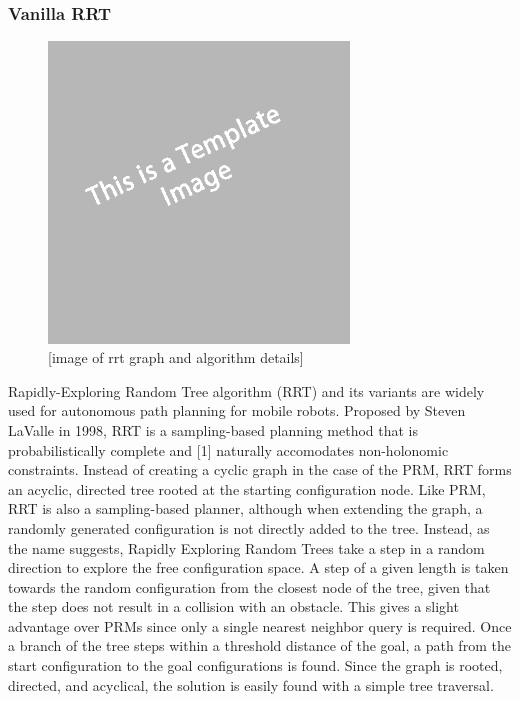 \documentclass[12pt]{article}
\begin{document}
        \subsubsection{Vanilla RRT}
            \begin{figure}[ht]
                \includegraphics[width=8cm]{temp}
                \centering
                \caption{[image of rrt graph and algorithm details]}
            \end{figure}
            \par  Rapidly-Exploring Random Tree algorithm (RRT) and its variants are widely used for autonomous path planning for mobile robots. Proposed by Steven LaValle in 1998, RRT is a sampling-based planning method that is probabilistically complete and [1] naturally accomodates non-holonomic constraints. Instead of creating a cyclic graph in the case of the PRM, RRT forms an acyclic, directed tree rooted at the starting configuration node. Like PRM, RRT is also a sampling-based planner, although when extending the graph, a randomly generated configuration is not directly added to the tree. Instead, as the name suggests, Rapidly Exploring Random Trees take a step in a random direction to explore the free configuration space. A step of a given length is taken towards the random configuration from the closest node of the tree, given that the step does not result in a collision with an obstacle. This gives a slight advantage over PRMs since only a single nearest neighbor query is required. Once a branch of the tree steps within a threshold distance of the goal, a path from the start configuration to the goal configurations is found. Since the graph is rooted, directed, and acyclical, the solution is easily found with a simple tree traversal. 
\end{document}
